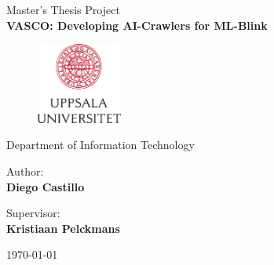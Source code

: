 \begin{center}
    {\Large Master's Thesis Project \\}
    {\huge {\textbf{VASCO: Developing AI-Crawlers for ML-Blink}} \\}
    
    \vspace{3cm}
    \begin{figure}[H]
        \centering
        \includegraphics[width=0.25\textwidth]{report/images/logo-uu-se.png}
    \end{figure}
    
    {\Large Department of Information Technology \\}

    \vspace{2cm}
    {\Large Author: \\}
    {\Large \textbf{Diego Castillo} \\}
    
    \vspace{0.5cm}
    {\Large Supervisor: \\}
    {\Large \textbf{Kristiaan Pelckmans} \\}
    
    \vspace{3cm}
    {\Large \today}
\end{center}